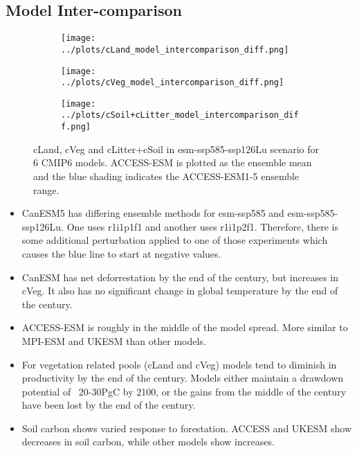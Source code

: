 \documentclass[]{article}
\begin{document}
\subsection{Model Inter-comparison}

\begin{figure}[H]
    \centering
    \begin{subfigure}[b]{0.45\linewidth}
        \texttt{[image: ../plots/cLand\_model\_intercomparison\_diff.png]}
    \end{subfigure}
    \begin{subfigure}[b]{0.45\linewidth}
        \texttt{[image: ../plots/cVeg\_model\_intercomparison\_diff.png]}
    \end{subfigure}
    \begin{subfigure}[b]{0.45\linewidth}
        \texttt{[image: ../plots/cSoil+cLitter\_model\_intercomparison\_diff.png]}
    \end{subfigure}
    \caption{cLand, cVeg and cLitter+cSoil in esm-ssp585-ssp126Lu scenario for 6 CMIP6 models. ACCESS-ESM is plotted as the ensemble mean and the blue shading indicates the ACCESS-ESM1-5 ensemble range.}
    \label{fig:models_cpools}
\end{figure}

\begin{itemize}
    \item CanESM5 has differing ensemble methods for esm-ssp585 and esm-ssp585-ssp126Lu. One uses r1i1p1f1 and another uses r1i1p2f1. Therefore, there is some additional perturbation applied to one of those experiments which causes the blue line to start at negative values.
    \item CanESM has net deforrestation by the end of the century, but increases in cVeg. It also has no significant change in global temperature by the end of the century.
    \item ACCESS-ESM is roughly in the middle of the model spread. More similar to MPI-ESM and UKESM than other models.
    \item For vegetation related pools (cLand and cVeg) models tend to diminish in productivity by the end of the century. Models  either maintain a drawdown potential of ~20-30PgC by 2100, or the gains from the middle of the century have been lost by the end of the century.
    \item Soil carbon shows varied response to forestation. ACCESS and UKESM show decreases in soil carbon, while other models show increases.
\end{itemize}
\end{document}
